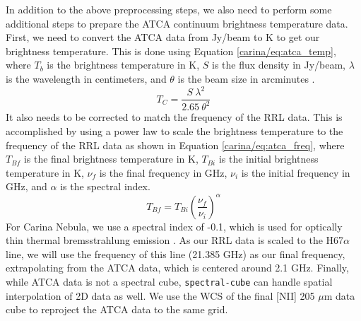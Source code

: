 In addition to the above preprocessing steps, we also need to perform some additional steps to prepare the ATCA continuum brightness temperature data.
First, we need to convert the ATCA data from Jy/beam to K to get our brightness temperature.
This is done using Equation \ref{carina/eq:atca_temp}, where $T_b$ is the brightness temperature in K, $S$ is the flux density in Jy/beam, $\lambda$ is the wavelength in centimeters, and $\theta$ is the beam size in arcminutes \parencite{rohlfs2013tools}.
\begin{equation}
    T_C = \frac{S\ \lambda^2}{2.65\ \theta^2}
    \label{carina/eq:atca_temp}
\end{equation}
It also needs to be corrected to match the frequency of the RRL data.
This is accomplished by using a power law to scale the brightness temperature to the frequency of the RRL data as shown in Equation \ref{carina/eq:atca_freq}, where $T_{Bf}$ is the final brightness temperature in K, $T_{Bi}$ is the initial brightness temperature in K, $\nu_{f}$ is the final frequency in GHz, $\nu_i$ is the initial frequency in GHz, and $\alpha$ is the spectral index.
\begin{equation}
    T_{Bf} = T_{Bi} \left( \frac{\nu_f}{\nu_i} \right)^\alpha
    \label{carina/eq:atca_freq}
\end{equation}
For Carina Nebula, we use a spectral index of -0.1, which is used for optically thin thermal bremsstrahlung emission \parencite{salatino2012spectral}.
As our RRL data is scaled to the H67$\alpha$ line, we will use the frequency of this line (21.385 GHz) as our final frequency, extrapolating from the ATCA data, which is centered around 2.1 GHz.
Finally, while ATCA data is not a spectral cube, \texttt{spectral-cube} can handle spatial interpolation of 2D data as well.
We use the WCS of the final [NII] 205 $\mu$m data cube to reproject the ATCA data to the same grid.

